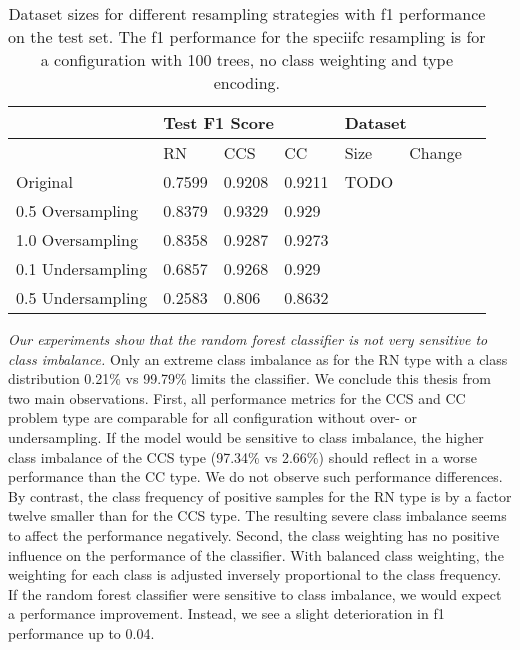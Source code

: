 \begin{table}[]
\begin{tabularx}{\textwidth}{lXXXXll}
\toprule
                    & \multicolumn{3}{l}{Test F1 Score} & \multicolumn{2}{l}{Dataset} &  \\ \midrule
                    & RN        & CCS        & CC     & Size            & Change    &  \\ \midrule
Original          &  0.7599   &  0.9208    &  0.9211  &  TODO           &           &  \\
0.5 Oversampling  &  0.8379   &  0.9329    &  0.929   &                 &           &  \\
1.0 Oversampling  &  0.8358   &  0.9287    &  0.9273  &                 &           &  \\ \midrule
0.1 Undersampling &  0.6857   &  0.9268    &  0.929   &                 &           &  \\
0.5 Undersampling &  0.2583   &  0.806     &  0.8632  &                 &           &  \\ \bottomrule
\end{tabularx}
\caption{Dataset sizes for different resampling strategies with f1 performance on the test set. The f1 performance for the speciifc resampling is for a configuration with 100 trees, no class weighting and type encoding.}
\label{tab:resampling_size_performance_rf}
\end{table}


\textit{Our experiments show that the random forest classifier is not very sensitive to class imbalance.} Only an extreme class imbalance as for the RN type with a class distribution 0.21\% vs 99.79\% limits the classifier. We conclude this thesis from two main observations. 
First, all performance metrics for the CCS and CC problem type are comparable for all configuration without over- or undersampling. If the model would be sensitive to class imbalance, the higher class imbalance of the CCS type (97.34\% vs 2.66\%) should reflect in a worse performance than the CC type. We do not observe such performance differences. By contrast, the class frequency of positive samples for the RN type is by a factor twelve smaller than for the CCS type. The resulting severe class imbalance seems to affect the performance negatively. 
Second, the class weighting has no positive influence on the performance of the classifier. With balanced class weighting, the weighting for each class is adjusted inversely proportional to the class frequency. If the random forest classifier were sensitive to class imbalance, we would expect a performance improvement. Instead, we see a slight deterioration in f1 performance up to 0.04.


